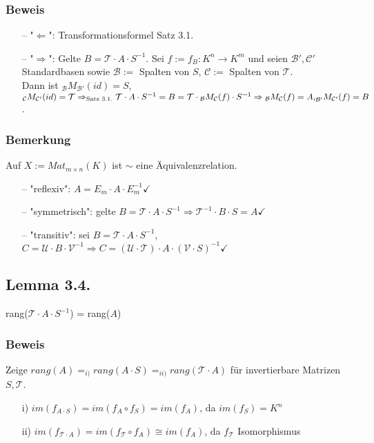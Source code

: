 \documentclass[a4paper,twoside]{article}
\newcommand{\tn}[1]{\textnormal {#1}}
\begin{document}
\subsubsection*{Beweis}
\begin{itemize}
	\item[--] "$\Leftarrow$": Transformationsformel Satz 3.1.
	\item[--] "$\Rightarrow$": Gelte $B = \mathcal{T} \cdot A \cdot S^{-1}$. Sei $f := f_B: K^n \longrightarrow K^m$ und seien $\mathcal{B'}, \mathcal{C'}$ Standardbasen sowie $\mathcal{B} := $ Spalten von $S$, $\mathcal{C} := $ Spalten von $\mathcal{T}$.\\ Dann ist ${_\mathcal B}M_\mathcal{B'}(id) = S$, $_\mathcal{C}M_\mathcal{C'}(id) = \mathcal{T} \Rightarrow_{\tn{Satz 3.1.}} \mathcal{T} \cdot A \cdot S^{-1} = B = \mathcal{T} \cdot {_\mathcal B}M_\mathcal{C}(f) \cdot S^{-1}\\ \Rightarrow {_\mathcal B}M_\mathcal{C}(f) = A\tn{,} _\mathcal{B'}M_\mathcal{C'}(f) = B$.
\end{itemize}
\subsubsection*{Bemerkung}
Auf $X := Mat_{m\times n}(K)$ ist $\sim$ eine Äquivalenzrelation.
\begin{itemize}
	\item[--] "reflexiv": $A = E_m \cdot A \cdot E_m^{-1} \checkmark$
	\item[--] "symmetrisch": gelte $B = \mathcal{T} \cdot A \cdot S^{-1} \Rightarrow \mathcal{T}^{-1} \cdot B \cdot S = A \checkmark$
	\item[--] "transitiv": sei $B = \mathcal{T} \cdot A \cdot S^{-1}$, $C = \mathcal{U} \cdot B \cdot \mathcal{V}^{-1} \Rightarrow C = (\mathcal{U} \cdot \mathcal{T}) \cdot A \cdot (\mathcal{V} \cdot S)^{-1} \checkmark$
\end{itemize}
\subsection*{Lemma 3.4.}
rang($\mathcal{T} \cdot A \cdot S^{-1}$) = rang($A$)
\subsubsection*{Beweis}
Zeige $rang(A) =_{i)} rang(A \cdot S) =_{ii)} rang(\mathcal{T} \cdot A)$ für invertierbare Matrizen $S, \mathcal{T}$.
\begin{itemize}
	\item[i)] $im(f_{A \cdot S}) = im(f_A \circ f_S) = im(f_A)$, da $im(f_S) = K^n$
	\item[ii)] $im(f_{\mathcal{T} \cdot A}) = im(f_\mathcal{T} \circ f_A) \cong im(f_A)$, da $f_\mathcal{T}$ Isomorphismus
\end{itemize}
\end{document}

